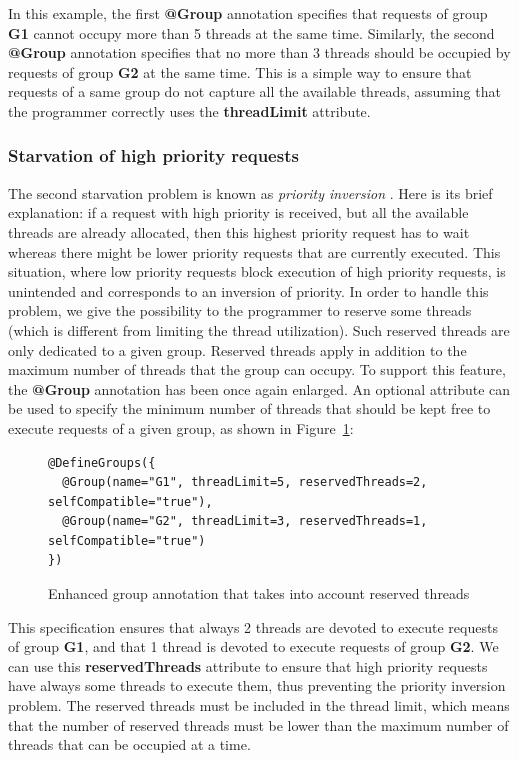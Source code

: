 \documentclass[11pt]{report}
\begin{document}
In this example, the first \textbf{@Group} annotation specifies that requests of group \textbf{G1} cannot occupy more than 5 threads at the same time. Similarly, the second \textbf{@Group} annotation specifies that no more than 3 threads should be occupied by requests of group \textbf{G2} at the same time.
This is a simple way to ensure that requests of a same group do not capture all the available threads, assuming that the programmer correctly uses the \textbf{threadLimit} attribute.

\subsubsection{Starvation of high priority requests}
The second starvation problem is known as \emph{priority inversion} \cite{Lampson:1980:EPM:358818.358824}. Here is its brief explanation: if a request with high priority is received, but all the available threads are already allocated, then this highest priority request has to wait whereas there might be lower priority requests that are currently executed. This situation, where low priority requests block execution of high priority requests, is unintended and corresponds to an inversion of priority. In order to handle this problem, we give the possibility to the programmer to reserve some threads (which is different from limiting the thread utilization). Such reserved threads are only dedicated to a given group. Reserved threads apply in addition to the maximum number of threads that the group can occupy. To support this feature, the \textbf{@Group} annotation has been once again enlarged. An optional attribute can be used to specify the minimum number of threads that should be kept free to execute requests of a given group, as shown in Figure~\ref{fig:new_new_groups}:

\begin{figure}[!ht]
	\lstset{language=java, numbers=left, numberstyle=\tiny, stepnumber=1, numbersep=5pt, basicstyle=\footnotesize}
	\begin{lstlisting}[frame=single]
@DefineGroups({
  @Group(name="G1", threadLimit=5, reservedThreads=2, selfCompatible="true"),
  @Group(name="G2", threadLimit=3, reservedThreads=1, selfCompatible="true")
})
 	\end{lstlisting}
\caption{Enhanced group annotation that takes into account reserved threads}
\label{fig:new_new_groups}
\end{figure}

This specification ensures that always 2 threads are devoted to execute requests of group \textbf{G1}, and that 1 thread is devoted to execute requests of group \textbf{G2}. We can use this \textbf{reservedThreads} attribute to ensure that high priority requests have always some threads to execute them, thus preventing the priority inversion problem.
The reserved threads must be included in the thread limit, which means that the number of reserved threads must be lower than the maximum number of threads that can be occupied at a time.
\end{document}
